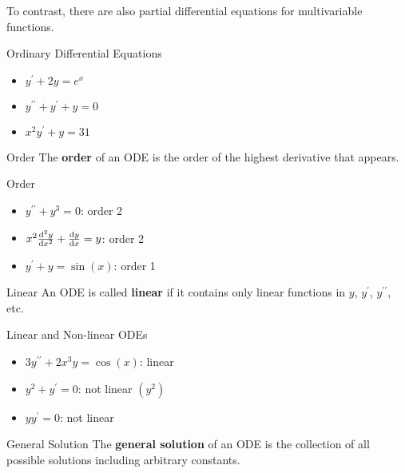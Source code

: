 \begin{Remark}{}{}
    To contrast, there are also partial differential equations for multivariable functions.
\end{Remark}

\begin{Example}{Ordinary Differential Equations}{}
    \begin{itemize}
        \item $ y^\prime+2y=e^x $
        \item $ y^{\prime\prime}+y^\prime+y=0 $
        \item $ x^2y^\prime+y=31 $
    \end{itemize}
\end{Example}

\begin{Definition}{Order}{}
    The \textbf{order} of an ODE is the order of the highest derivative that appears.
\end{Definition}

\begin{Example}{Order}{}
    \begin{itemize}
        \item $ y^{\prime\prime}+y^3=0 $: order 2
        \item $ x^2\odv[order=2]{y}{x} +\odv{y}{x} =y $: order 2
        \item $ y^\prime+y=\sin(x) $: order 1
    \end{itemize}
\end{Example}

\begin{Definition}{Linear}{}
    An ODE is called \textbf{linear} if it contains only linear functions in $ y $, $ y^\prime $,
    $ y^{\prime\prime} $, etc.
\end{Definition}

\begin{Example}{Linear and Non-linear ODEs}{}
    \begin{itemize}
        \item $ 3y^{\prime\prime}+2x^3y=\cos(x) $: linear
        \item $ y^2+y^\prime=0 $: not linear $ (y^2) $
        \item $ yy^\prime=0 $: not linear
    \end{itemize}
\end{Example}

\begin{Definition}{General Solution}{}
    The \textbf{general solution} of an ODE is the collection of all possible
    solutions including arbitrary constants.
\end{Definition}

